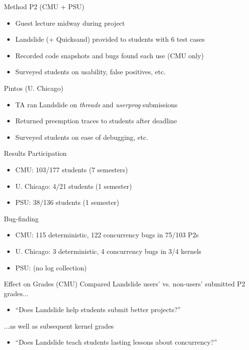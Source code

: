 \documentclass[xcolor=dvipsnames]{beamer}
\begin{document}
\begin{frame}{Method}
	P2 (CMU + PSU)
	\begin{itemize}
		\item Guest lecture midway during project
		\item Landslide (+ Quicksand) provided to students with 6 test cases %
		\item Recorded code snapshots and bugs found each use (CMU only)
		\item Surveyed students on usability, false positives, etc.
	\end{itemize}
	\pause
	\linegap

	Pintos (U. Chicago)
	\begin{itemize}
		\item TA %
			ran Landslide on {\em threads} and {\em userprog} submissions
		\item Returned preemption traces to students after deadline
		\item Surveyed students on ease of debugging, etc.
	\end{itemize}
\end{frame}

\begin{frame}{Results}
	Participation
	\begin{itemize}
		\item CMU: 103/177 students (7 semesters)
		\item U. Chicago: 4/21 students (1 semester)
		\item PSU: 38/136 students (1 semester)
	\end{itemize}
	\linegap

	Bug-finding
	\begin{itemize}
		\item CMU: 115 deterministic, 122 concurrency bugs in 75/103 P2s
		\item U. Chicago: 3 deterministic, 4 concurrency bugs in 3/4 kernels
		\item PSU: (no log collection) %
	\end{itemize}
\end{frame}

\begin{frame}{Effect on Grades (CMU)}
	Compared Landslide users' vs. non-users' submitted P2 grades...
	\begin{itemize}
		\item ``Does Landslide help students submit better projects?''
	\end{itemize}
	\linegap

	...as well as subsequent kernel grades
	\begin{itemize}
		\item ``Does Landslide teach students lasting lessons about concurrency?''
	\end{itemize}
\end{frame}
\end{document}
